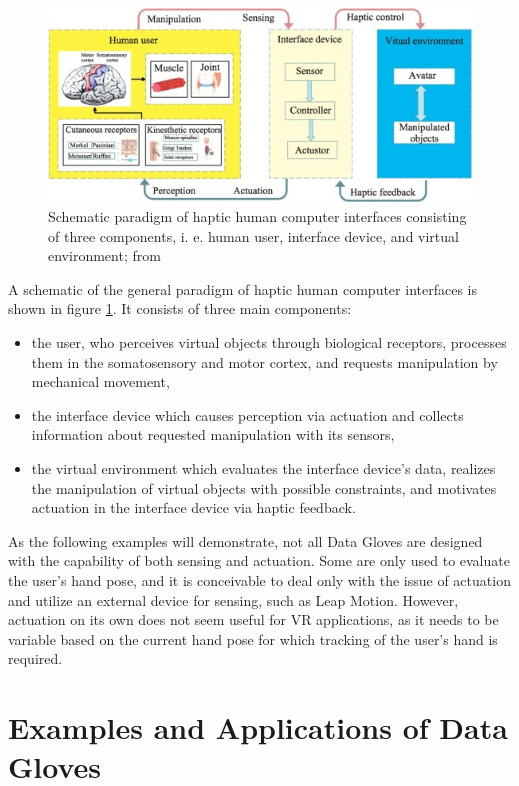 \documentclass[hyperref, bachelorofscience]{cgvpub}
\begin{document}
\begin{figure}[t!]
	\centering
	\includegraphics[width=.8\linewidth]{../pics/wang01}
	\caption[Schematic paradigm of haptic human computer interfaces]{Schematic paradigm of haptic human computer interfaces consisting of three components, i. e. human user, interface device, and virtual environment; from \cite{wang19}}
	\label{fig:hci}
\end{figure}

A schematic of the general paradigm of haptic human computer interfaces is shown in figure \ref{fig:hci}. It consists of three main components:
\vspace{.3cm}
\begin{itemize}
	\item the user, who perceives virtual objects through biological receptors, processes them in the somatosensory and motor cortex, and requests manipulation by mechanical movement,
	\item the interface device which causes perception via actuation and collects information about requested manipulation with its sensors,
	\item the virtual environment which evaluates the interface device's data, realizes the manipulation of virtual objects with possible constraints, and motivates actuation in the interface device via haptic feedback.
\end{itemize}

As the following examples will demonstrate, not all Data Gloves are designed with the capability of both sensing and actuation. Some are only used to evaluate the user's hand pose, and it is conceivable to deal only with the issue of actuation and utilize an external device for sensing, such as Leap Motion. However, actuation on its own does not seem useful for VR applications, as it needs to be variable based on the current hand pose for which tracking of the user's hand is required.

\section{Examples and Applications of Data Gloves} \label{sec:ex}
\end{document}
